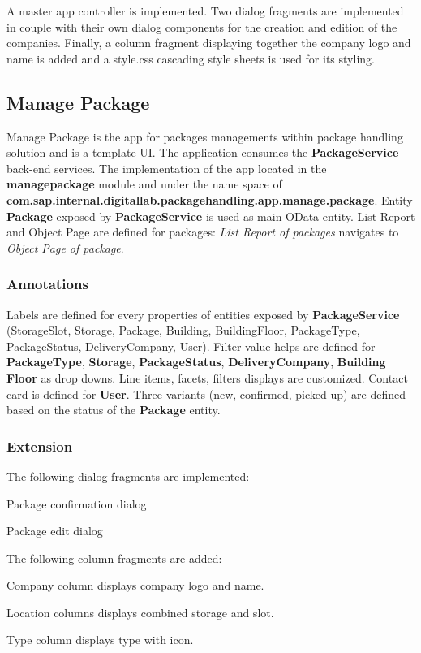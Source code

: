 A master app controller is implemented.
Two dialog fragments are implemented in couple with their own dialog components for the creation and edition of the companies. Finally, a column fragment displaying together the company logo and name is added and a style.css cascading style sheets is used for its styling. 

\subsection{Manage Package}

Manage Package is the app for packages managements within package handling solution and is a template UI.
The application consumes the \textbf{PackageService} back-end services.
The implementation of the app
located in the \textbf{managepackage} module and under the name space of
\textbf{com.sap.internal.digitallab.packagehandling.app.manage.package}.
Entity \textbf{Package} exposed by  \textbf{PackageService} is used as main OData entity.
List Report and Object Page are defined for packages: \textit{List Report of packages} navigates to \textit{Object Page of package}.

\subsubsection{Annotations}
Labels are defined for every properties of entities exposed by \textbf{PackageService} (StorageSlot, Storage, Package, Building, BuildingFloor, PackageType, PackageStatus, DeliveryCompany, User). 
Filter value helps are defined for \textbf{PackageType}, \textbf{Storage}, \textbf{PackageStatus}, \textbf{DeliveryCompany}, \textbf{Building Floor} as drop downs.
Line items, facets, filters displays are customized.
Contact card is defined for \textbf{User}.
Three variants (new, confirmed, picked up) are defined based on the status of the \textbf{Package} entity.

\subsubsection{Extension}
The following dialog fragments are implemented:
\begin{compactenum}
    \item Package confirmation dialog
    \item Package edit dialog
\end{compactenum}

\bigskip
The following column fragments are added:
\begin{compactenum}
    \item Company column displays company logo and name.
    \item Location columns displays combined storage and slot.
    \item Type column displays type with icon.
\end{compactenum}

